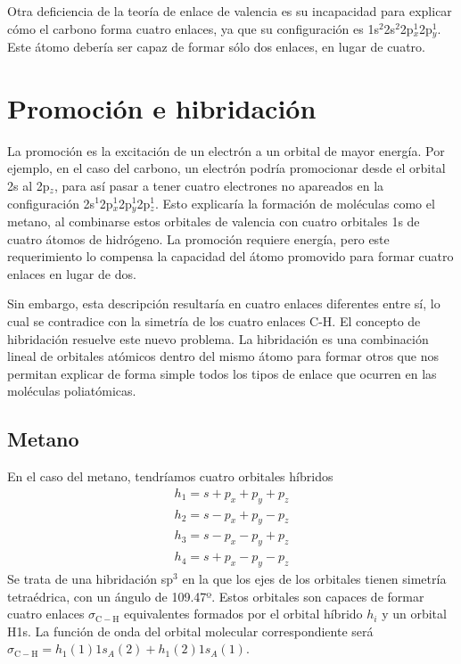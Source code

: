 \documentclass{tufte-handout}
\begin{document}
Otra deficiencia de la teoría de enlace de valencia
es su incapacidad para explicar cómo el carbono
forma cuatro enlaces, ya que su configuración es 
1s$^2$2s$^2$2p$^1_x$2p$_y^1$. Este átomo debería 
ser capaz de formar sólo dos enlaces, en lugar de
cuatro.

\section{Promoción e hibridación}
La promoción es la excitación de un electrón 
a un orbital de mayor energía. Por ejemplo, en
el caso del carbono, un electrón podría promocionar
desde el orbital 2s al 2p$_z$, para así pasar a tener
cuatro electrones no apareados en la configuración
2s$^1$2p$_x^1$2p$_y^1$2p$_z^1$. Esto explicaría la
formación de moléculas como el metano, al combinarse
estos orbitales de valencia con cuatro orbitales 1s 
de cuatro átomos de hidrógeno. La promoción requiere
energía, pero este requerimiento lo compensa la
capacidad del átomo promovido para formar 
cuatro enlaces en lugar de dos.

Sin embargo, esta descripción resultaría en cuatro 
enlaces diferentes entre sí, lo cual se contradice
con la simetría de los cuatro enlaces C-H. El 
concepto de hibridación resuelve este nuevo problema.
La hibridación es una combinación lineal de orbitales
atómicos dentro del mismo átomo para formar otros que 
nos permitan explicar de forma simple todos los tipos 
de enlace que ocurren en las moléculas poliatómicas.

\subsection{Metano}
En el caso del metano, tendríamos cuatro orbitales 
híbridos
\begin{align*}
    h_1=s+p_x+p_y+p_z\\
    h_2=s-p_x+p_y-p_z\\
    h_3=s-p_x-p_y+p_z\\
    h_4=s+p_x-p_y-p_z
\end{align*}
Se trata de una hibridación sp$^3$ en la que los ejes 
de los orbitales tienen simetría tetraédrica, con
un ángulo de 109.47º. Estos orbitales son capaces de
formar cuatro enlaces $\sigma_\mathrm{C-H}$ equivalentes
formados por el orbital híbrido $h_i$ y un orbital 
H1s. La función de onda del orbital molecular correspondiente
será $\sigma_\mathrm{C-H}= h_1(1)1s_{A}(2)+h_1(2)1s_{A}(1)$.
\end{document}
